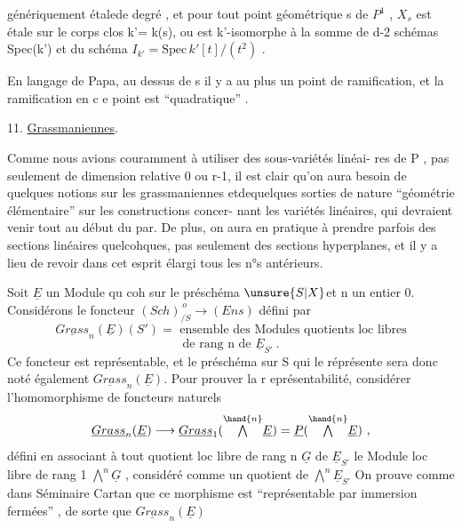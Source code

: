
génériquement étalede degré , et pour tout point géométrique  s de $P^1$ ,  $X_s$
est étale sur le corps \hand{$-$} clos k'= k(s), ou   est
k'-isomorphe à la somme de d-2  schémas Spec(k')   et   du schéma  
$I_{k'} = \mathrm{Spec}\, k'[t]/(t^2)$ .

En langage de Papa, au  dessus de s  il y a au plus un point de
ramification, et la ramification en c e point est ``quadratique'' .

11.  \uline{Grassmaniennes}. 

Comme nous avions couramment à utiliser des sous-variétés linéai-%
res de P , pas seulement de dimension relative 0 ou r-1, il est clair
qu'on aura besoin de quelques notions sur les grassmaniennes  etdequelques
sorties de nature ``géométrie élémentaire'' sur les constructions concer-%
nant les variétés linéaires, qui  devraient venir tout au début du par.
De plus, on aura en pratique à prendre parfois des sections linéaires
quelcohques, pas seulement des sections hyperplanes, et il y a lieu de
revoir dans cet esprit élargi tous les n°s antérieurs.

Soit  $\underline{E}$  un Module qu coh  sur le préschéma $\unsure{S|X}$et n un entier \hand{$>$} 0.\hand{,} Considérons le
foncteur \qquad $(Sch)_{/S}^{\,o} \longrightarrow (Ens)$  défini par
\[ \underline{Grass}_n(\underline{E})(S') = \text{ ensemble des Modules quotients loc libres} \]
\[ \text{de rang  n  de } \underline{E}_{S'} \ . \]
Ce foncteur est représentable, et le préschéma sur S qui le réprésente
sera donc noté également $\underline{Grass}_n(\underline{E})$.  Pour prouver la r eprésentabilité,
considérer l'homomorphisme de foncteurs naturels
\[ \underline{Grass}_n(\underline{E}) \longrightarrow \underline{Grass}_1( \overset{\hand{n}}{\textstyle\bigwedge} \underline{E} ) = \underline{P} ( \overset{\hand{n}}{\textstyle\bigwedge} \underline{E}) \ , \]
défini en associant à  tout  quotient loc libre  de rang n  $\underline{G}$  de $\underline{E}_{S'}$
le Module  loc libre de rang 1 \quad $\overset{n}{\textstyle\bigwedge} \underline{G}$ , considéré comme un quotient
de  $\overset{n}{\textstyle\bigwedge} \underline{E}_{S'}$   On prouve comme dans  Séminaire Cartan que  ce morphisme
est  ``représentable par  immersion fermées'' , de sorte que $\underline{Grass}_n(\underline{E})$

